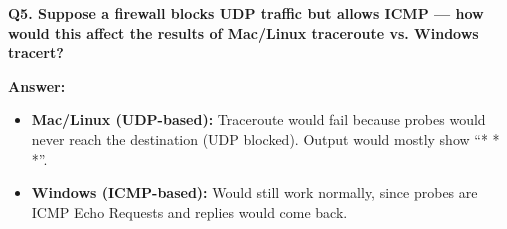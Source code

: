 \documentclass[12pt, a4paper]{report}
\begin{document}
\textbf{Q5. Suppose a firewall blocks UDP traffic but allows ICMP — how would this affect the results of Mac/Linux traceroute vs. Windows tracert?}

\textbf{Answer:}  
\begin{itemize}[leftmargin=*]
    \item \textbf{Mac/Linux (UDP-based):} Traceroute would fail because probes would never reach the destination (UDP blocked). Output would mostly show ``* * *''.  
    \item \textbf{Windows (ICMP-based):} Would still work normally, since probes are ICMP Echo Requests and replies would come back.  
\end{itemize}
\end{document}
